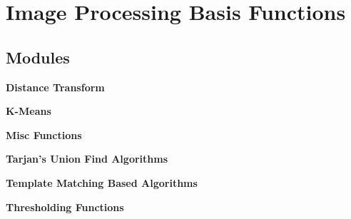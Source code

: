 \section{Image Processing Basis Functions}
\label{group__ImageProcessing}
\subsection*{Modules}
\begin{CompactItemize}
\item 
{\bf Distance Transform}
\item 
{\bf K-Means}
\item 
{\bf Misc Functions}
\item 
{\bf Tarjan's Union Find Algorithms}
\item 
{\bf Template Matching Based Algorithms}
\item 
{\bf Thresholding Functions}
\end{CompactItemize}
